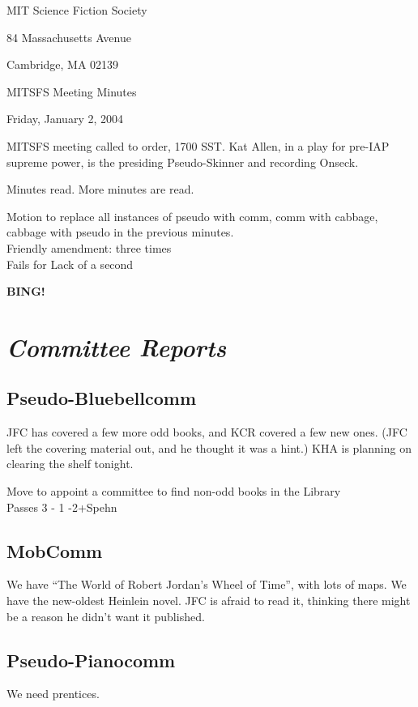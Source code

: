 \documentclass[10pt]{article}
\newcommand{\bing}{{\bf BING!} }
\newcommand{\goto}[1]{\bing \vskip 12pt \section*{{\em{#1}}}}
\begin{document}
\begin{center}

MIT Science Fiction Society 

84 Massachusetts Avenue

Cambridge, MA 02139

\vspace{12pt}

MITSFS Meeting Minutes 

Friday, January 2, 2004

\end{center}
 
\vspace{18pt}

\setlength{\parskip}{6pt}

\noindent
MITSFS meeting called to order, 1700 SST.
Kat Allen, in a play for pre-IAP supreme power, is the presiding 
Pseudo-Skinner and recording Onseck.

Minutes read. More minutes are read.

Motion to replace all instances of pseudo with comm, comm with
cabbage, cabbage with pseudo in the previous minutes. \\
Friendly amendment: three times\\
Fails for Lack of a second

\goto{Committee Reports}
\subsection*{Pseudo-Bluebellcomm}
JFC has covered a few more odd books, and KCR covered a few new
ones. (JFC left the covering material out, and he thought it was a
hint.) KHA is planning on clearing the shelf tonight.

Move to appoint a committee to find non-odd books in the Library\\
Passes 3 - 1  -2+Spehn 
\subsection*{MobComm}
We have  ``The World of Robert Jordan's Wheel of Time'', with lots of maps.
We have the new-oldest Heinlein novel. JFC is afraid to read it,
thinking there might be a reason he didn't want it published.

\subsection*{Pseudo-Pianocomm}
We need prentices.
\end{document}
